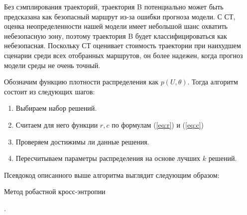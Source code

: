 Без сэмплирования траекторий, траектория B потенциально может быть предсказана как безопасный маршрут из-за ошибки прогноза модели.  С СТ,
оценка неопределенности нашей модели имеет небольшой
шанс охватить небезопасную зону, поэтому траектория B будет
классифицироваться как небезопасная. Поскольку СТ оценивает стоимость
траектории при наихудшем сценарии среди всех отобранных маршрутов, он более надежен, когда прогноз модели среды не очень точный.


Обозначим функцию плотности распределения как $p(U, \theta)$. 
Тогда алгоритм состоит из следующих шагов: 
\begin{enumerate}
	\item Выбираем набор решений.
	\item Считаем для него функции $r, c$ по формулам (\ref{eq:r}) и (\ref{eq:c})
	\item Проверяем достижимы ли данные решения. 
	\item Пересчитываем параметры распределения на основе лучших $k$ решений.
\end{enumerate}

Псевдокод описанного выше алгоритма выглядит следующим образом: 
\begin{algorithm}
	\caption{Метод робастной кросс-энтропии}\label{cem}
	\begin{algorithmic}[1]
		
		\Else{}
		.
		\EndIf
		\EndWhile
	\end{algorithmic}
\end{algorithm}
\bigskip

